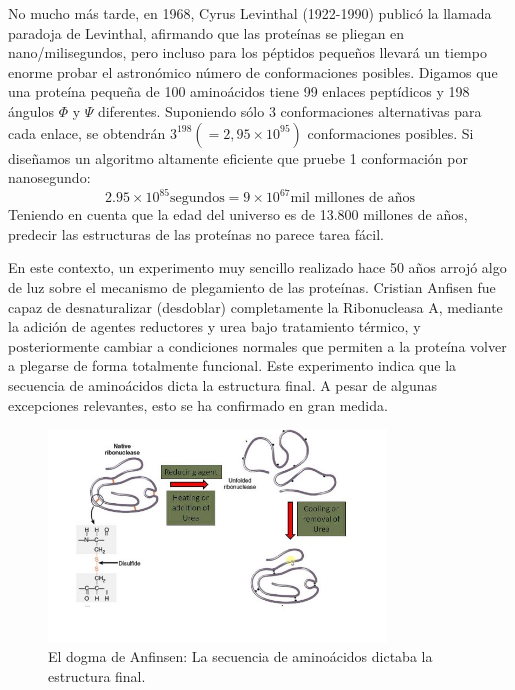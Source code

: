 No mucho más tarde, en 1968, Cyrus Levinthal (1922-1990) publicó la llamada paradoja de Levinthal, afirmando que las proteínas se pliegan en nano/milisegundos, pero incluso para los péptidos pequeños llevará un tiempo enorme probar el astronómico número de conformaciones posibles. Digamos que una proteína pequeña de 100 aminoácidos tiene 99 enlaces peptídicos y 198 ángulos $\Phi$ y $\Psi$ diferentes. Suponiendo sólo 3 conformaciones alternativas para cada enlace, se obtendrán $3^{198} (= 2,95 \times 10^{95})$ conformaciones posibles. Si diseñamos un algoritmo altamente eficiente que pruebe 1 conformación por nanosegundo:
$$2.95 \times 10^{85} \text{segundos} = 9 \times 10^{67} \text{mil millones de años}$$
Teniendo en cuenta que la edad del universo es de 13.800 millones de años, predecir las estructuras de las proteínas no parece tarea fácil.

En este contexto, un experimento muy sencillo realizado hace 50 años arrojó algo de luz sobre el mecanismo de plegamiento de las proteínas. Cristian Anfisen fue capaz de desnaturalizar (desdoblar) completamente la Ribonucleasa A, mediante la adición de agentes reductores y urea bajo tratamiento térmico, y posteriormente cambiar a condiciones normales que permiten a la proteína volver a plegarse de forma totalmente funcional. Este experimento indica que la secuencia de aminoácidos dicta la estructura final. A pesar de algunas excepciones relevantes, esto se ha confirmado en gran medida.
\begin{figure}[h]
\centering
\includegraphics[width = 0.8\textwidth]{figs/anfinsen.jpg}
\caption{El dogma de Anfinsen: La secuencia de aminoácidos dictaba la estructura final. }
\end{figure}

